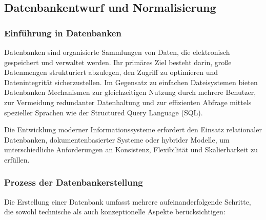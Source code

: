 \subsection{Datenbankentwurf und Normalisierung}
\label{subsec:datenbankentwurf-und-normalisierung}

\subsubsection{Einführung in Datenbanken}

Datenbanken sind organisierte Sammlungen von Daten, die elektronisch gespeichert und verwaltet werden.
Ihr primäres Ziel besteht darin, große Datenmengen strukturiert abzulegen, den Zugriff zu optimieren und Datenintegrität sicherzustellen.
Im Gegensatz zu einfachen Dateisystemen bieten Datenbanken Mechanismen zur gleichzeitigen Nutzung durch mehrere Benutzer,
zur Vermeidung redundanter Datenhaltung und zur effizienten Abfrage mittels spezieller Sprachen wie der Structured Query Language (SQL).

Die Entwicklung moderner Informationssysteme erfordert den Einsatz relationaler Datenbanken, dokumentenbasierter Systeme
oder hybrider Modelle, um unterschiedliche Anforderungen an Konsistenz, Flexibilität und Skalierbarkeit zu erfüllen.

\subsubsection{Prozess der Datenbankerstellung}

Die Erstellung einer Datenbank umfasst mehrere aufeinanderfolgende Schritte, die sowohl technische als auch konzeptionelle Aspekte berücksichtigen:


